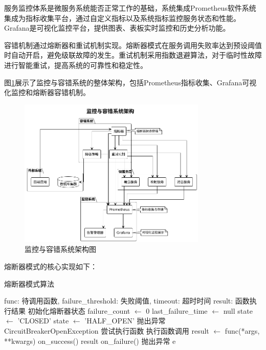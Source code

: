 服务监控体系是微服务系统能否正常工作的基础，系统集成Prometheus软件系统集成为指标收集平台，通过自定义指标以及系统指标监控服务状态和性能。Grafana是可视化监控平台，提供图表、表板实时监控和历史分析功能。

容错机制通过熔断器和重试机制实现。熔断器模式在服务调用失败率达到预设阈值时自动开启，避免级联故障的发生。重试机制采用指数退避算法，对于临时性故障进行智能重试，提高系统的可靠性和稳定性。

图\ref{fig:monitoring_fault_tolerance}展示了监控与容错系统的整体架构，包括Prometheus指标收集、Grafana可视化监控和熔断器容错机制。

\begin{figure}[H]
    \centering
    \includegraphics[width=0.8\textwidth]{chapters/fig-0/monitoring_fault_tolerance.png}
    \caption{监控与容错系统架构图}
    \label{fig:monitoring_fault_tolerance}
\end{figure}

熔断器模式的核心实现如下：

\begin{algorithm}[H]
\caption{熔断器模式算法}
\begin{algorithmic}[1]
\REQUIRE func: 待调用函数, failure\_threshold: 失败阈值, timeout: 超时时间
\ENSURE result: 函数执行结果
\STATE 初始化熔断器状态
\STATE failure\_count $\leftarrow$ 0
\STATE last\_failure\_time $\leftarrow$ null
\STATE state $\leftarrow$ 'CLOSED'
        \STATE state $\leftarrow$ 'HALF\_OPEN'
    \ELSE
        \STATE 抛出异常 CircuitBreakerOpenException
    \ENDIF
\ENDIF
\STATE 尝试执行函数
\STATE 执行函数调用
\STATE result $\leftarrow$ func(*args, **kwargs)
    \STATE on\_success()
    \RETURN result
\ELSE
    \STATE on\_failure()
    \STATE 抛出异常 e
\ENDIF
\end{algorithmic}
\end{algorithm}

